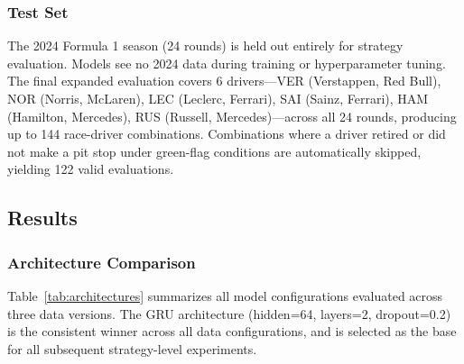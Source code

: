 \subsubsection{Test Set}

The 2024 Formula 1 season (24 rounds) is held out entirely for strategy evaluation. Models see no 2024 data during training or 
hyperparameter tuning. The final expanded evaluation covers 6 drivers---VER (Verstappen, Red Bull), NOR (Norris, McLaren), 
LEC (Leclerc, Ferrari), SAI (Sainz, Ferrari), HAM (Hamilton, Mercedes), RUS (Russell, Mercedes)---across all 24 rounds, 
producing up to 144 race-driver combinations. Combinations where a driver retired or did not make a pit stop under green-flag 
conditions are automatically skipped, yielding 122 valid evaluations.

\subsection{Results}

\subsubsection{Architecture Comparison}

Table~\ref{tab:architectures} summarizes all model configurations evaluated across three data versions. The GRU architecture (hidden=64, layers=2, dropout=0.2) is the consistent winner across all data configurations, and is selected as the base for all subsequent strategy-level experiments.

